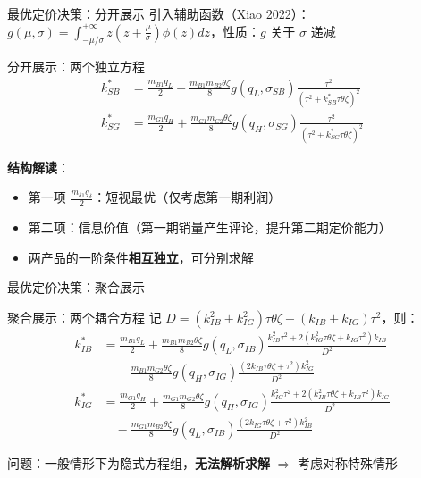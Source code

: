 \documentclass[aspectratio=169,10pt]{beamer}
\newcommand{\pos}[1]{\textcolor{positive}{#1}}
\newcommand{\con}[1]{\textcolor{negative}{#1}}
\newcommand{\HL}[1]{\textcolor{emphasis}{#1}}
\begin{document}
\begin{frame}{最优定价决策：分开展示}
引入辅助函数（Xiao 2022）：$g(\mu, \sigma) = \int_{-\mu/\sigma}^{+\infty} z(z + \frac{\mu}{\sigma})\phi(z)dz$，性质：$g$ 关于 $\sigma$ 递减

\vspace{8pt}
\begin{alertblock}{分开展示：两个独立方程}
\vspace{-6pt}
\begin{align*}
k_{SB}^* &= \frac{m_{B1} q_L}{2} + \frac{m_{B1} m_{B2}\theta\zeta}{8} g(q_L, \sigma_{SB}) \frac{\tau^2}{(\tau^2 + k_{SB}^*\tau\theta\zeta)^2}\\[4pt]
k_{SG}^* &= \frac{m_{G1} q_H}{2} + \frac{m_{G1} m_{G2}\theta\zeta}{8} g(q_H, \sigma_{SG}) \frac{\tau^2}{(\tau^2 + k_{SG}^*\tau\theta\zeta)^2}
\end{align*}
\end{alertblock}

\vspace{8pt}
\textbf{结构解读}：
\begin{itemize}
    \item 第一项 $\frac{m_{\delta 1} q_\delta}{2}$：\HL{短视最优}（仅考虑第一期利润）
    \item 第二项：\pos{信息价值}（第一期销量产生评论，提升第二期定价能力）
    \item 两产品的一阶条件\textbf{相互独立}，可分别求解
\end{itemize}
\end{frame}

\begin{frame}{最优定价决策：聚合展示}
\begin{exampleblock}{聚合展示：两个耦合方程}
记 $D = (k_{IB}^2+k_{IG}^2)\tau\theta\zeta + (k_{IB}+k_{IG})\tau^2$，则：
\begin{align*}
k_{IB}^* &= \frac{m_{B1} q_L}{2} + \frac{m_{B1} m_{B2}\theta\zeta}{8} g(q_L, \sigma_{IB}) \frac{k_{IB}^2\tau^2 + 2(k_{IG}^2\tau\theta\zeta + k_{IG}\tau^2)k_{IB}}{D^2}\\
&\quad - \frac{m_{B1} m_{G2}\theta\zeta}{8} g(q_H, \sigma_{IG}) \frac{(2k_{IB}\tau\theta\zeta + \tau^2)k_{IG}^2}{D^2}\\[4pt]
k_{IG}^* &= \frac{m_{G1} q_H}{2} + \frac{m_{G1} m_{G2}\theta\zeta}{8} g(q_H, \sigma_{IG}) \frac{k_{IG}^2\tau^2 + 2(k_{IB}^2\tau\theta\zeta + k_{IB}\tau^2)k_{IG}}{D^2}\\
&\quad - \frac{m_{G1} m_{B2}\theta\zeta}{8} g(q_L, \sigma_{IB}) \frac{(2k_{IG}\tau\theta\zeta + \tau^2)k_{IB}^2}{D^2}
\end{align*}
\end{exampleblock}

\vspace{6pt}
\con{问题}：一般情形下为隐式方程组，\textbf{无法解析求解} $\Rightarrow$ 考虑对称特殊情形
\end{frame}
\end{document}
